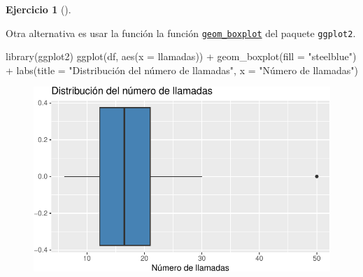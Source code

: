 \documentclass[
  a4paper,
]{scrreport}
\newenvironment{Shaded}{\begin{snugshade}}{\end{snugshade}}
\newcommand{\AttributeTok}[1]{\textcolor[rgb]{0.40,0.45,0.13}{#1}}
\newcommand{\FunctionTok}[1]{\textcolor[rgb]{0.28,0.35,0.67}{#1}}
\newcommand{\NormalTok}[1]{\textcolor[rgb]{0.00,0.23,0.31}{#1}}
\newcommand{\SpecialCharTok}[1]{\textcolor[rgb]{0.37,0.37,0.37}{#1}}
\newcommand{\StringTok}[1]{\textcolor[rgb]{0.13,0.47,0.30}{#1}}
\theoremstyle{definition}
\newtheorem{exercise}{Ejercicio}[chapter]
\theoremstyle{remark}
\begin{document}
\begin{exercise}[]
\begin{tcolorbox}
\begin{figure}[H]
{}

\end{figure}

\end{tcolorbox}

\begin{tcolorbox}[enhanced jigsaw, coltitle=black, breakable, bottomtitle=1mm, colbacktitle=quarto-callout-tip-color!10!white, rightrule=.15mm, opacityback=0, opacitybacktitle=0.6, left=2mm, colframe=quarto-callout-tip-color-frame, title=\textcolor{quarto-callout-tip-color}{\faLightbulb}\hspace{0.5em}{Solución 2}, toprule=.15mm, toptitle=1mm, arc=.35mm, colback=white, titlerule=0mm, bottomrule=.15mm, leftrule=.75mm]

Otra alternativa es usar la función la función
\href{https://aprendeconalf.es/manual-r/07-graficos.html\#diagramas-de-cajas}{\texttt{geom\_boxplot}}
del paquete \texttt{ggplot2}.

\begin{Shaded}
\begin{Highlighting}[]
\FunctionTok{library}\NormalTok{(ggplot2)}
\FunctionTok{ggplot}\NormalTok{(df, }\FunctionTok{aes}\NormalTok{(}\AttributeTok{x =}\NormalTok{ llamadas)) }\SpecialCharTok{+}
    \FunctionTok{geom\_boxplot}\NormalTok{(}\AttributeTok{fill =} \StringTok{"steelblue"}\NormalTok{) }\SpecialCharTok{+}
    \FunctionTok{labs}\NormalTok{(}\AttributeTok{title =} \StringTok{"Distribución del número de llamadas"}\NormalTok{, }\AttributeTok{x =} \StringTok{"Número de llamadas"}\NormalTok{)}
\end{Highlighting}
\end{Shaded}

\begin{figure}[H]

{\centering \includegraphics{./03-frecuencias-graficos_files/figure-pdf/unnamed-chunk-12-1.pdf}

}
\end{figure}
\end{tcolorbox}
\end{exercise}
\end{document}
